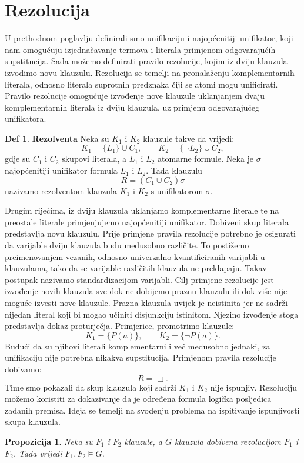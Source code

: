 \documentclass{article}
\theoremstyle{definition}
\newtheorem{definicija}{Def}[section]
\theoremstyle{plain}
\newtheorem{lema}{Propozicija}[section]
\begin{document}
\section{Rezolucija}
U prethodnom poglavlju definirali smo unifikaciju i najopćenitiji unifikator, koji nam omogućuju izjednačavanje termova i literala primjenom odgovarajućih supstitucija. Sada možemo definirati pravilo rezolucije, kojim iz dviju klauzula izvodimo novu klauzulu. Rezolucija se temelji na pronalaženju komplementarnih literala, odnosno literala suprotnih predznaka čiji se atomi mogu unificirati. Pravilo rezolucije omogućuje izvođenje nove klauzule uklanjanjem dvaju komplementarnih literala iz dviju klauzula, uz primjenu odgovarajućeg unifikatora.
\begin{definicija}\textbf{Rezolventa}\newline
Neka su $K_1$ i $K_2$ klauzule takve da vrijedi:
\[
K_1=\{L_1\}\cup C_1,
\qquad
K_2=\{\neg L_2\}\cup C_2,
\]
gdje su $C_1$ i $C_2$ skupovi literala, a $L_1$ i $L_2$ atomarne formule. Neka je $\sigma$ najopćenitiji unifikator formula $L_1$ i $L_2$. Tada klauzulu
\[
R=(C_1\cup C_2)\sigma
\]
nazivamo rezolventom klauzula $K_1$ i $K_2$ s unifikatorom $\sigma$.
\end{definicija}
Drugim riječima, iz dviju klauzula uklanjamo komplementarne literale te na preostale literale primjenjujemo najopćenitiji unifikator. Dobiveni skup literala predstavlja novu klauzulu. Prije primjene pravila rezolucije potrebno je osigurati da varijable dviju klauzula budu međusobno različite. To postižemo preimenovanjem vezanih, odnosno univerzalno kvantificiranih varijabli u klauzulama, tako da se varijable različitih klauzula ne preklapaju. Takav postupak nazivamo standardizacijom varijabli. Cilj primjene rezolucije jest izvođenje novih klauzula sve dok ne dobijemo praznu klauzulu ili dok više nije moguće izvesti nove klauzule. Prazna klauzula uvijek je neistinita jer ne sadrži nijedan literal koji bi mogao učiniti disjunkciju istinitom. Njezino izvođenje stoga predstavlja dokaz proturječja.
Primjerice, promotrimo klauzule:
\[
K_1=\{P(a)\},\qquad K_2=\{\neg P(a)\}.
\]
Budući da su njihovi literali komplementarni i već međusobno jednaki, za unifikaciju nije potrebna nikakva supstitucija. Primjenom pravila rezolucije dobivamo:
\[
R=\Box.
\]
Time smo pokazali da skup klauzula koji sadrži $K_1$ i $K_2$ nije ispunjiv. Rezoluciju možemo koristiti za dokazivanje da je određena formula logička posljedica zadanih premisa. Ideja se temelji na svođenju problema na ispitivanje ispunjivosti skupa klauzula.
\begin{lema} Neka su $F_1$ i $F_2$ klauzule, a $G$ klauzula dobivena rezolucijom $F_1$ i $F_2$. Tada vrijedi $F_1,F_2\models G$.
\end{lema}
\end{document}

